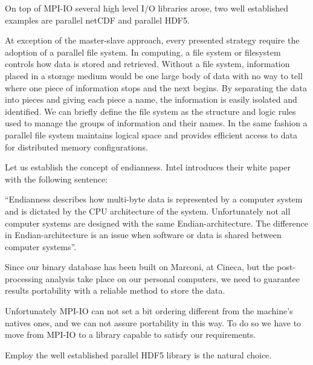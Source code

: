 On top of MPI-IO several high level I/O libraries arose, two well established examples are parallel netCDF and parallel HDF5. 

At exception of the master-slave approach, every presented strategy require the adoption of a parallel file system.
In computing, a file system or filesystem controls how data is stored and retrieved. Without a file system, information placed in a storage medium would be one large body of data with no way to tell where one piece of information stops and the next begins. By separating the data into pieces and giving each piece a name, the information is easily isolated and identified. We can briefly define the file system as the structure and logic rules used to manage the groups of information and their names.
In the same fashion a parallel file system maintains logical space and provides efficient access to data for distributed memory configurations.\\
\par
Let us establish the concept of endianness.
Intel introduces their white paper with the following sentence:\par
``Endianness describes how multi-byte data is represented by a computer system and is dictated by the CPU architecture of the system. Unfortunately not all computer systems are designed with the same Endian-architecture. The difference in Endian-architecture is an issue when software or data is shared between computer systems''\cite{endianness}.\par
Since our binary database has been built on Marconi, at Cineca, but the post-processing analysis take place on our personal computers, we need to guarantee results portability with a reliable method to store the data. \\
\par
Unfortunately MPI-IO can not set a bit ordering different from the machine's natives ones, and we can not assure portability in this way. To do so we have to move from MPI-IO to a library capable to satisfy our requirements.\par
Employ the well established parallel HDF5 library is the natural choice.



